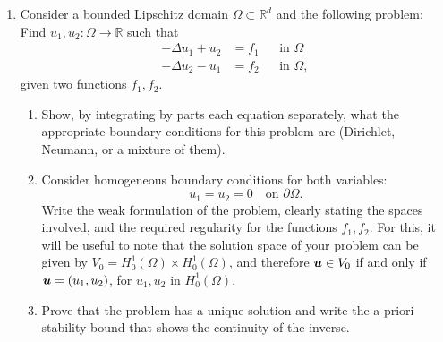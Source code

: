 \documentclass{article}
\renewcommand{\vec}{\vectorsym}
\newcommand{\R}{\mathbb{R}}
\begin{document}
\begin{enumerate}
        \item{} Consider a bounded Lipschitz domain $\Omega\subset \R^d$ and the following problem: Find $u_1, u_2:\Omega \to \R$ such that
            $$ 
            \begin{aligned}
                -\Delta u_1 + u_2 &= f_1  && \text{in $\Omega$} \\
                -\Delta u_2 - u_1 &= f_2  && \text{in $\Omega$},
            \end{aligned}
            $$
            given two functions $f_1,f_2$. 
            \begin{enumerate}
                \item{} Show, by integrating by parts each equation separately, what the appropriate boundary conditions for this problem are (Dirichlet, Neumann, or a mixture of them). 
                \item{} Consider homogeneous boundary conditions for both variables: 
                        $$ u_1 = u_2 = 0 \quad\text{on $\partial\Omega$}. $$
                       Write the weak formulation of the problem, clearly stating the spaces involved, and the required regularity for the functions $f_1, f_2$. For this, it will be useful to note that the solution space of your problem can be given by $V_0 = H_0^1(\Omega)\times H_0^1(\Omega)$, and therefore $\vec u \in V_0$ if and only if $\vec u = (u_1, u_2)$, for $u_1, u_2$ in $H_0^1(\Omega)$. 
                   \item{} Prove that the problem has a unique solution and write the a-priori stability bound that shows the continuity of the inverse. 
            \end{enumerate}


\end{enumerate}
\end{document}
